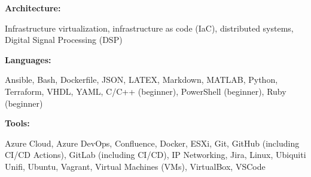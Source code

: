 \location{}
\vspace{0.5em}
\textbf{Architecture:} \newline
\vspace{-\topsep}
\vspace{-0.25em}
\begin{tightemize}
    \item Infrastructure virtualization, infrastructure as code (IaC), distributed systems, Digital Signal Processing (DSP)
\end{tightemize}
\vspace{0.25em}
\textbf{Languages:} \newline
\vspace{-\topsep}
\vspace{-0.25em}
\begin{tightemize}
    \item Ansible, Bash, Dockerfile, JSON, LATEX, Markdown, MATLAB, Python, Terraform, VHDL, YAML, C/C++ (beginner), PowerShell (beginner), Ruby (beginner)
\end{tightemize}
\vspace{0.25em}
\textbf{Tools:} \newline
\vspace{-\topsep}
\vspace{-0.25em}
\begin{tightemize}
    \item Azure Cloud, Azure DevOps, Confluence, Docker, ESXi, Git, GitHub (including CI/CD Actions), GitLab (including CI/CD), IP Networking, Jira, Linux, Ubiquiti Unifi, Ubuntu, Vagrant, Virtual Machines (VMs), VirtualBox, VSCode
\end{tightemize}

\vspace{0.25em}


\sectionsep{}
